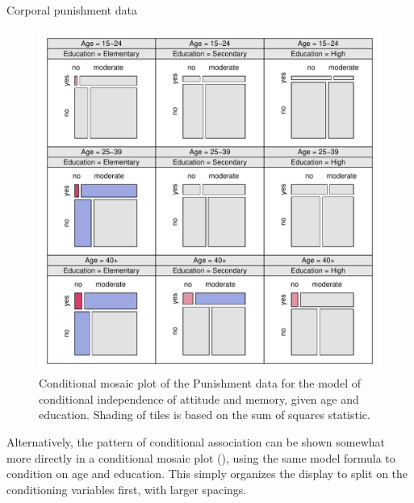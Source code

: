 \documentclass[11pt]{book}
\renewenvironment{knitrout}{\small\renewcommand{\baselinestretch}{.85}}{} %
\begin{document}
\begin{Example}[punish]{Corporal punishment data}
\begin{knitrout}
\begin{figure}[!htb]
\centerline{\includegraphics[width=.95\textwidth]{ch05/fig/punish-cond1} }

\caption[Conditional mosaic plot of the Punishment data for the model of conditional independence of attitude and memory, given age and education]{Conditional mosaic plot of the Punishment data for the model of conditional independence of attitude and memory, given age and education. Shading of tiles is based on the sum of squares statistic.\label{fig:punish-cond1}}
\end{figure}


\end{knitrout}

Alternatively, the pattern of conditional association can be shown somewhat more directly
in a conditional mosaic plot (), using the same model formula to condition on
age and education. This simply organizes the display to split on the conditioning
variables first, with larger spacings.
\begin{knitrout}
\color{fgcolor}\begin{kframe}
\begin{alltt}
\hlstd{(}\hlopt{~}  \hlopt{+}  \hlopt{|}  \hlopt{+}   
       \hlstd{=}\hlstd{,} \hlstd{=}\hlstd{(}\hlstd{=}\hlopt{:}\hlstd{))}
\end{alltt}
\end{kframe}\begin{figure}[!htb]



\end{figure}
\end{knitrout}
\end{Example}
\end{document}
